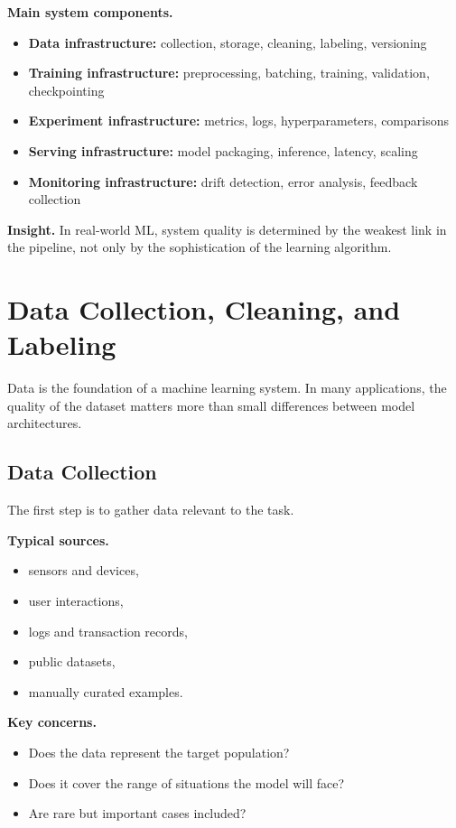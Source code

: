 \noindent
\textbf{Main system components.}
\begin{itemize}
    \item \textbf{Data infrastructure:} collection, storage, cleaning, labeling, versioning
    \item \textbf{Training infrastructure:} preprocessing, batching, training, validation, checkpointing
    \item \textbf{Experiment infrastructure:} metrics, logs, hyperparameters, comparisons
    \item \textbf{Serving infrastructure:} model packaging, inference, latency, scaling
    \item \textbf{Monitoring infrastructure:} drift detection, error analysis, feedback collection
\end{itemize}

\medskip

\noindent
\textbf{Insight.}
In real-world ML, system quality is determined by the weakest link in the pipeline, not only by the sophistication of the learning algorithm.

\section{Data Collection, Cleaning, and Labeling}

Data is the foundation of a machine learning system. In many applications, the quality of the dataset matters more than small differences between model architectures.

\subsection{Data Collection}

The first step is to gather data relevant to the task.

\medskip

\noindent
\textbf{Typical sources.}
\begin{itemize}
    \item sensors and devices,
    \item user interactions,
    \item logs and transaction records,
    \item public datasets,
    \item manually curated examples.
\end{itemize}

\medskip

\noindent
\textbf{Key concerns.}
\begin{itemize}
    \item Does the data represent the target population?
    \item Does it cover the range of situations the model will face?
    \item Are rare but important cases included?
\end{itemize}

